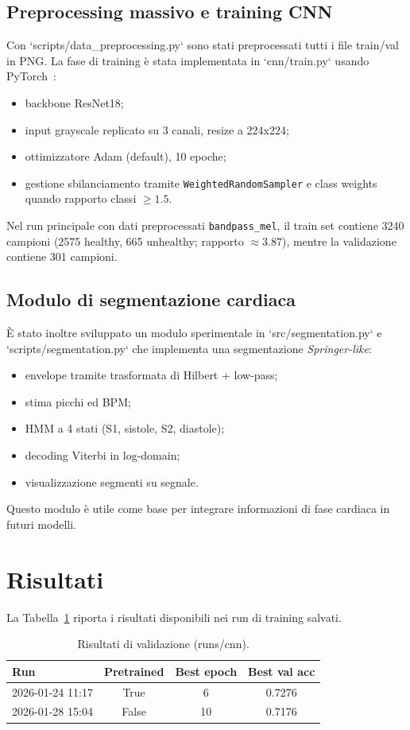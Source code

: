 \documentclass[a4paper,11pt]{article}
\begin{document}
\subsection*{Preprocessing massivo e training CNN}
Con `scripts/data_preprocessing.py` sono stati preprocessati tutti i file train/val in PNG. La fase di training è stata implementata in `cnn/train.py` usando PyTorch~\cite{paszke2019pytorch}:
\begin{itemize}
  \item backbone ResNet18;
  \item input grayscale replicato su 3 canali, resize a 224x224;
  \item ottimizzatore Adam (default), 10 epoche;
  \item gestione sbilanciamento tramite \texttt{WeightedRandomSampler} e class weights quando rapporto classi $\geq 1.5$.
\end{itemize}

Nel run principale con dati preprocessati \texttt{bandpass\_mel}, il train set contiene 3240 campioni (2575 healthy, 665 unhealthy; rapporto $\approx 3.87$), mentre la validazione contiene 301 campioni.

\subsection*{Modulo di segmentazione cardiaca}
È stato inoltre sviluppato un modulo sperimentale in `src/segmentation.py` e `scripts/segmentation.py` che implementa una segmentazione \emph{Springer-like}:
\begin{itemize}
  \item envelope tramite trasformata di Hilbert + low-pass;
  \item stima picchi ed BPM;
  \item HMM a 4 stati (S1, sistole, S2, diastole);
  \item decoding Viterbi in log-domain;
  \item visualizzazione segmenti su segnale.
\end{itemize}
Questo modulo è utile come base per integrare informazioni di fase cardiaca in futuri modelli.

\section{Risultati}
La Tabella~\ref{tab:cnn_results} riporta i risultati disponibili nei run di training salvati.

\begin{table}[h]
\centering
\caption{Risultati di validazione (runs/cnn).}
\label{tab:cnn_results}
\begin{tabular}{lccc}
\toprule
Run & Pretrained & Best epoch & Best val acc \\
\midrule
2026-01-24 11:17 & True  & 6  & 0.7276 \\
2026-01-28 15:04 & False & 10 & 0.7176 \\
\bottomrule
\end{tabular}
\end{table}
\end{document}
